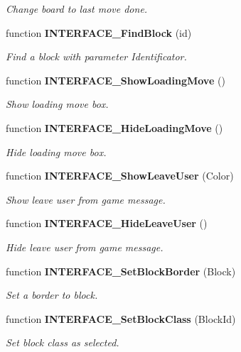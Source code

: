 \begin{CompactItemize}
\begin{CompactList}\small\item\em Change board to last move done. \item\end{CompactList}\item 
function {\bf INTERFACE\_\-FindBlock} (id)
\begin{CompactList}\small\item\em Find a block with parameter Identificator. \item\end{CompactList}\item 
function {\bf INTERFACE\_\-ShowLoadingMove} ()
\begin{CompactList}\small\item\em Show loading move box. \item\end{CompactList}\item 
function {\bf INTERFACE\_\-HideLoadingMove} ()
\begin{CompactList}\small\item\em Hide loading move box. \item\end{CompactList}\item 
function {\bf INTERFACE\_\-ShowLeaveUser} (Color)
\begin{CompactList}\small\item\em Show leave user from game message. \item\end{CompactList}\item 
function {\bf INTERFACE\_\-HideLeaveUser} ()
\begin{CompactList}\small\item\em Hide leave user from game message. \item\end{CompactList}\item 
function {\bf INTERFACE\_\-SetBlockBorder} (Block)
\begin{CompactList}\small\item\em Set a border to block. \item\end{CompactList}\item 
function {\bf INTERFACE\_\-SetBlockClass} (BlockId)
\begin{CompactList}\small\item\em Set block class as selected. \item\end{CompactList}\item 

\end{CompactItemize}
